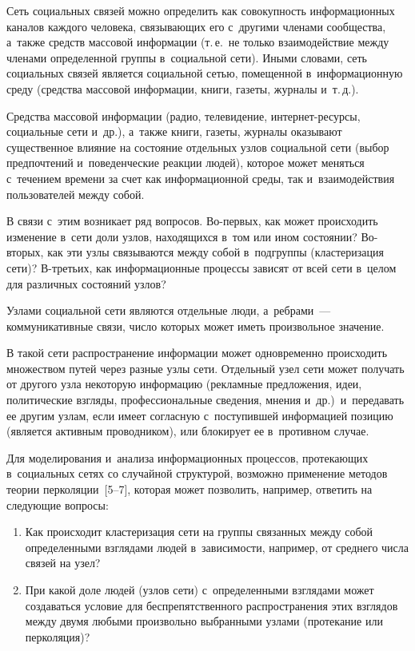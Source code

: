 \begin{multicols}{2}
  Сеть социальных связей можно определить как со\-во\-куп\-ность 
информационных каналов каж\-до\-го человека, свя\-зы\-ва\-ющих его с~другими 
членами сообщества, а~так\-же средств массовой информации (т.\,е.\ не только 
взаимодействие между членами определенной группы в~социальной сети). 
Иными словами, сеть социальных связей является социальной сетью, 
помещенной в~информационную среду (средства массовой информации, книги, 
газеты, журналы и~т.\,д.).
  
  Средства массовой информации (радио, телевидение, ин\-тер\-нет-ре\-сур\-сы, 
социальные сети и~др.), а~так\-же книги, газеты, журналы оказывают 
существенное влияние на со\-сто\-яние отдельных узлов социальной сети (выбор 
предпочтений и~поведенческие реакции людей), которое может меняться 
с~течением времени  за счет как информационной среды, так 
и~взаимодействия пользователей между собой. 
  
  В связи с~этим возникает ряд вопросов. Во-пер\-вых, как может происходить 
изменение в~сети доли узлов, находящихся в~том или ином со\-сто\-янии?  
Во-вто\-рых, как эти узлы свя\-зы\-ва\-ют\-ся между собой в~подгруппы 
(клас\-те\-ри\-за\-ция сети)? В-треть\-их, как информационные процессы зависят от 
всей сети в~целом для различных со\-сто\-яний узлов?
  
  Узлами социальной сети являются отдельные люди, а~реб\-ра\-ми~--- 
коммуникативные связи, чис\-ло которых может иметь произвольное значение. 
  
  В такой сети распространение информации может одновременно 
происходить множеством путей\linebreak
 через разные узлы сети. Отдельный узел сети 
может получать от другого узла некоторую инфор\-мацию (рекламные 
предложения, идеи, политические взгляды, профессиональные сведения, 
\mbox{мнения} и~др.)\ и~передавать ее другим узлам, если имеет со\-глас\-ную 
с~по\-сту\-пив\-шей информацией позицию (является активным проводником), или 
блокирует ее в~противном случае. 
  
  Для моделирования и~анализа информационных процессов, протекающих 
в~социальных сетях со случайной структурой, воз\-мож\-но применение методов 
теории перколяции~[5--7], которая может поз\-во\-лить, например, ответить на 
сле\-ду\-ющие вопросы:
  \begin{enumerate}[1.]
\item Как происходит клас\-те\-ри\-за\-ция сети на группы связанных между собой 
определенными взглядами людей в~за\-ви\-си\-мости, например, от среднего чис\-ла 
связей на узел?
\item При какой доле людей (узлов сети) с~определенными взглядами может 
создаваться условие для беспрепятственного распространения этих взглядов 
между двумя любыми произвольно вы\-бран\-ны\-ми узлами (протекание или 
пер\-ко\-ля\-ция)? 
  \end{enumerate}
  

\end{multicols}
